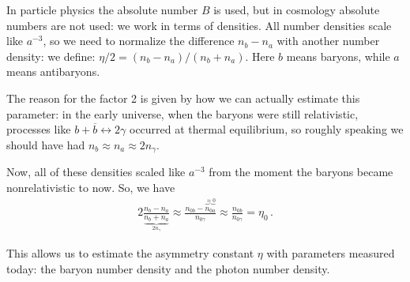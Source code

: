 \documentclass[main.tex]{subfiles}
\begin{document}
In particle physics the absolute number \(B\) is used, but in cosmology absolute numbers are not used: we work in terms of densities.
All number densities scale like \(a^{-3}\), so we need to normalize the difference \(n_b - n_a\) with another number density: we define: \(\eta/2 = (n_b - n_a) / (n_b + n_a)\). Here \(b\) means baryons, while \(a\) means antibaryons. 

The reason for the factor 2 is given by how we can actually estimate this parameter: in the early universe, when the baryons were still relativistic, processes like \(b + \overline{b} \leftrightarrow 2 \gamma \) occurred at thermal equilibrium, so roughly speaking we should have had \(n_b \approx n_a \approx 2 n_\gamma \).


Now, all of these densities scaled like \(a^{-3}\) from the moment the baryons became nonrelativistic to now. So, we have 
%
\begin{align}
2 \frac{n_b - n_a}{\underbrace{n_b + n_a}_{2 n_\gamma }} \approx \frac{n_{0b} - \overbrace{n_{0a}}^{\approx 0}}{n_{0\gamma}} \approx \frac{n_{0b}}{n_{0 \gamma }}  = \eta_0 
\,.
\end{align}
 
This allows us to estimate the asymmetry constant \(\eta \) with parameters measured today: the baryon number density and the photon number density. 

\end{document}

